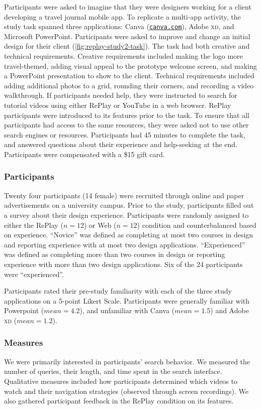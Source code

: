 Participants were asked to imagine that they were designers working for a client developing a travel journal mobile app. To replicate a multi-app activity, the study task spanned three applications: Canva (\href{https://canva.com}{\nolinkurl{canva.com}}), Adobe \textsc{xd}, and Microsoft PowerPoint. Participants were asked to improve and change an initial design for their client (\autoref{fig:replay-study2-task}). The task had both creative and technical requirements. Creative requirements included making the logo more travel-themed, adding visual appeal to the prototype welcome screen, and making a PowerPoint presentation to show to the client. Technical requirements included adding additional photos to a grid, rounding their corners, and recording a video walkthrough. If participants needed help, they were instructed to search for tutorial videos using either RePlay or YouTube in a web browser. RePlay participants were introduced to its features prior to the task. To ensure that all participants had access to the same resources, they were asked not to use other search engines or resources. Participants had 45 minutes to complete the task, and answered questions about their experience and help-seeking at the end. Participants were compensated with a \$15 gift card.

\subsubsection{Participants}
Twenty four participants (14 female) were recruited through online and paper advertisements on a university campus. Prior to the study, participants filled out a survey about their design experience. Participants were randomly assigned to either the RePlay ($n\!=\!12$) or Web ($n\!=\!12$) condition and counterbalanced based on experience. ``Novice'' was defined as completing at most two courses in design and reporting experience with at most two design applications. ``Experienced'' was defined as completing more than two courses in design or reporting experience with more than two design applications. Six of the 24 participants were ``experienced''. 

Participants rated their pre-study familiarity with each of the three study applications on a 5-point Likert Scale. Participants were generally familiar with Powerpoint ($mean\!=\!4.2$), and unfamiliar with Canva ($mean\!=\!1.5$) and Adobe \textsc{xd} ($mean\!=\!1.2$).
 
\subsubsection{Measures}
We were primarily interested in participants' search behavior. We measured the number of queries, their length, and time spent in the search interface. Qualitative measures included how participants determined which videos to watch and their navigation strategies (observed through screen recordings). We also gathered participant feedback in the RePlay condition on its features.

